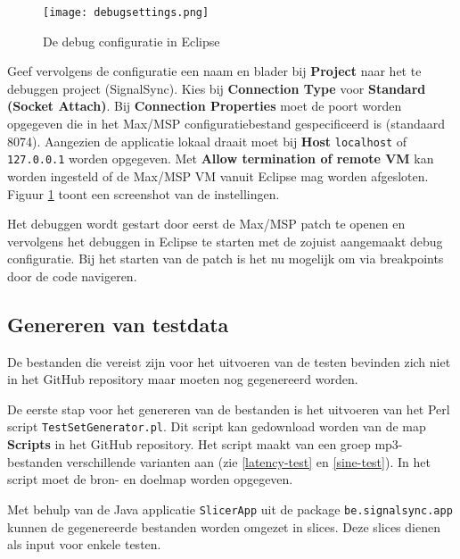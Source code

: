 \begin{figure}[!tbph]
	\captionsetup{width=0.7\textwidth}
	\caption{De debug configuratie in Eclipse}
	\begin{center}
		\advance\parskip0.3cm
		\texttt{[image: debugsettings.png]}
	\end{center}
	
	\label{debugsettings}
\end{figure}

Geef vervolgens de configuratie een naam en blader bij \textbf{Project} naar het te debuggen project (SignalSync). Kies bij \textbf{Connection Type} voor \textbf{Standard (Socket Attach)}. Bij \textbf{Connection Properties} moet de poort worden opgegeven die in het Max/MSP configuratiebestand gespecificeerd is (standaard 8074). Aangezien de applicatie lokaal draait moet bij \textbf{Host} \texttt{localhost} of \texttt{127.0.0.1} worden opgegeven. Met \textbf{Allow termination of remote VM} kan worden ingesteld of de Max/MSP VM vanuit Eclipse mag worden afgesloten. Figuur \ref{debugsettings} toont een screenshot van de instellingen.

Het debuggen wordt gestart door eerst de Max/MSP patch te openen en vervolgens het debuggen in Eclipse te starten met de zojuist aangemaakt debug configuratie. Bij het starten van de patch is het nu mogelijk om via breakpoints door de code navigeren.

\subsection*{Genereren van testdata}

De bestanden die vereist zijn voor het uitvoeren van de testen bevinden zich niet in het GitHub repository maar moeten nog gegenereerd worden. 

De eerste stap voor het genereren van de bestanden is het uitvoeren van het Perl script \texttt{TestSetGenerator.pl}. Dit script kan gedownload worden van de map \textbf{Scripts} in het GitHub repository. Het script maakt van een groep mp3-bestanden verschillende varianten aan (zie \ref{latency-test} en \ref{sine-test}). In het script moet de bron- en doelmap worden opgegeven.

Met behulp van de Java applicatie \texttt{SlicerApp} uit de package \texttt{be.signalsync.app} kunnen de gegenereerde bestanden worden omgezet in slices. Deze slices dienen als input voor enkele testen.


